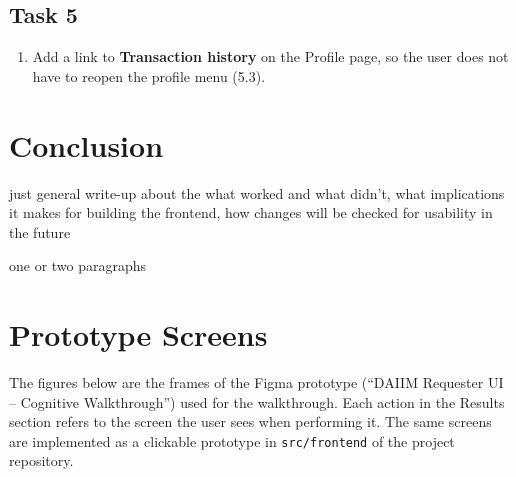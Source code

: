 \documentclass{article}
\begin{document}
\subsection{Task 5}
\begin{enumerate}
    \item Add a link to \textbf{Transaction history} on the Profile page, so the user does not have to reopen the profile menu (5.3).
\end{enumerate}


\section{Conclusion}
just general write-up about the what worked and what didn't,
what implications it makes for building the frontend, 
how changes will be checked for usability in the future

one or two paragraphs



\newpage
\appendix
\section{Prototype Screens}
\label{app:screens}
The figures below are the frames of the Figma prototype (``DAIIM Requester UI -- Cognitive Walkthrough'') used for the walkthrough. Each action in the Results section refers to the screen the user sees when performing it. The same screens are implemented as a clickable prototype in \texttt{src/frontend} of the project repository.
\end{document}

